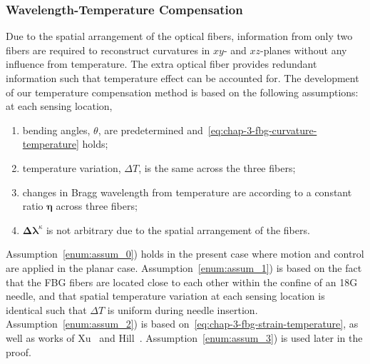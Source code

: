 \subsubsection{Wavelength-Temperature Compensation}
\label{sec:chap-3-wavelength-temperature-compensation}
Due to the spatial arrangement of the optical fibers, information from only two fibers are required to reconstruct curvatures in $xy$- and $xz$-planes without any influence from temperature. The extra optical fiber provides redundant information such that temperature effect can be accounted for. The development of our temperature compensation method is based on the following assumptions: at each sensing location,
\begin{enumerate}
\item bending angles, $\theta$, are predetermined and~\cref{eq:chap-3-fbg-curvature-temperature} holds\label{enum:assum_0};
\item temperature variation, $\Delta T$, is the same across the three fibers\label{enum:assum_1};
\item changes in Bragg wavelength from temperature are according to a constant ratio  $\boldsymbol \eta$ across three fibers\label{enum:assum_2};
\item $\mathbf{\Delta\boldsymbol\lambda}^{\kappa}$ is not arbitrary due to the spatial arrangement of the fibers\label{enum:assum_3}.
\end{enumerate}
Assumption~\ref{enum:assum_0}) holds in the present case where motion and control are applied in the planar case. Assumption~\ref{enum:assum_1}) is based on the fact that the FBG fibers are located close to each other within the confine of an 18G needle, and that spatial temperature variation at each sensing location is identical such that $\Delta T$ is uniform during needle insertion. Assumption~\ref{enum:assum_2}) is based on~\cref{eq:chap-3-fbg-strain-temperature}, as well as works of Xu~\parencite{xuDiscriminationStrainTemperature1994} and Hill~\parencite{hillFiberBraggGrating1997}. Assumption~\ref{enum:assum_3}) is used later in the proof.

